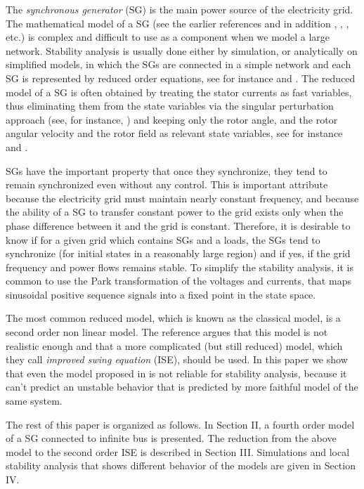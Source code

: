 \documentclass[conference]{IEEEtran}
\begin{document}
The {\em synchronous generator} (SG) is the main power source of the
electricity grid. The mathematical model of a SG (see the earlier
references and in addition \cite{Walker:94}, \cite{Fitzgerald:03},
\cite{MaWe:15}, etc.) is complex and difficult to use as a component
when we model a large network. Stability analysis is usually done
either by simulation, or analytically on simplified models, in which
the SGs are connected in a simple network and each SG is represented
by reduced order equations, see for instance \cite{DoBull:12} and
\cite{PoDoBu:13}. The reduced model of a SG is often obtained by
treating the stator currents as fast variables, thus eliminating them
from the state variables via the singular perturbation approach (see,
for instance, \cite{Khalil}) and keeping only the rotor angle, and the
rotor angular velocity and the rotor field as relevant state
variables, see for instance \cite{Kundur} and \cite{SauerPai1998}.

SGs have the important property that once they synchronize, they tend
to remain synchronized even without any control. This is important
attribute because the electricity grid must maintain nearly constant
frequency, and because the ability of a SG to transfer constant power
to the grid exists only when the phase difference between it and the
grid is constant. Therefore, it is desirable to know if for a given
grid which contains SGs and a loads, the SGs tend to synchronize (for
initial states in a reasonably large region) and if yes, if the grid
frequency and power flows remains stable. To simplify the stability
analysis, it is common to use the Park transformation of the voltages
and currents, that maps sinusoidal positive sequence signals into a
fixed point in the state space.

The most common reduced model, which is known as the classical model,
is a second order non linear model. The reference
\cite{DePersiSchaft:16} argues that this model is not realistic enough
and that a more complicated (but still reduced) model, which they call
{\em improved swing equation} (ISE), should be used. In this paper we show
that even the model proposed in \cite{DePersiSchaft:16} is not
reliable for stability analysis, because it can't predict an unstable
behavior that is predicted by more faithful model of the same system.

The rest of this paper is organized as follows. In Section II, a
fourth order model of a SG connected to infinite bus is presented. The
reduction from the above model to the second order
ISE is described in Section III.
Simulations and local stability analysis that shows different behavior
of the models are given in Section IV.
\end{document}
